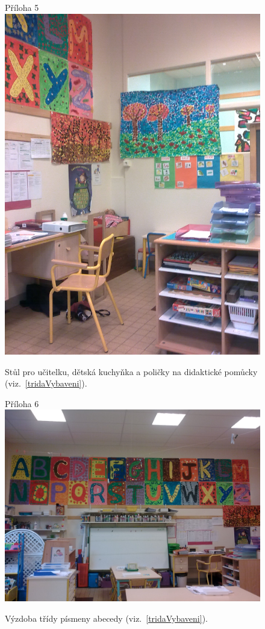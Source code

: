 	\begin{figure}[tb]
		\centering
		Příloha 5\\
		\includegraphics[height = 0.35\textheight]{./fotky/Obr5.jpg}
		\caption{
			Stůl pro učitelku, dětská kuchyňka a poličky na didaktické pomůcky (viz.~\ref{tridaVybaveni}).
		}
		\label{Obr5}
	\end{figure}

	\begin{figure}[tb]
		\centering
		Příloha 6\\
		\includegraphics[height = 0.35\textheight]{./fotky/Obr6.jpg}
		\caption{
			Výzdoba třídy písmeny abecedy (viz.~\ref{tridaVybaveni}).
		}
		\label{Obr6}
	\end{figure}


